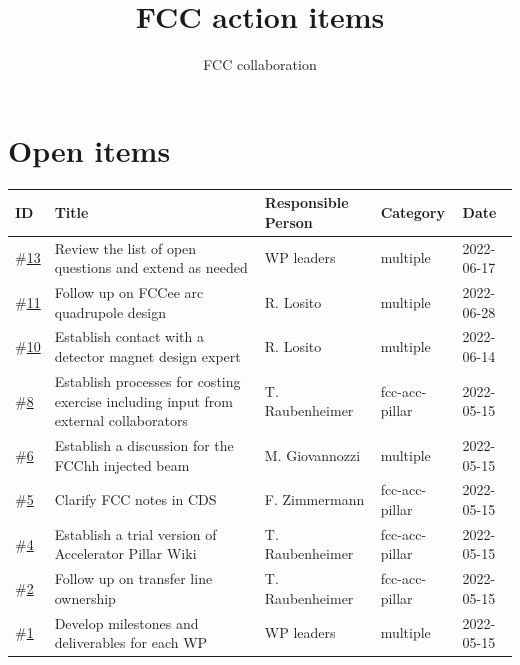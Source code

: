 \documentclass[12pt]{article}
\title{FCC action items}
\author{FCC collaboration}
\date{\LARGE{\color{red}{\textbf{\today}}}}
\begin{document}
	\maketitle

    \section*{Open items}

    \begingroup
    \setlength{\tabcolsep}{10pt} %
    \renewcommand{\arraystretch}{1.5} %
    \begin{longtable}{|m{0.8cm} | m{6cm} | m{3.5cm} | m{2.5cm} | m{2cm}|}
        \hline
        ID & Title & Responsible Person & Category & Date \\
        \hline
        \#\href{https://github.com/fcccollab/fcc-action-items/issues/13}{13} & Review the list of open questions and extend as needed & WP leaders & multiple & 2022-06-17 \\ 
        \hline
        \#\href{https://github.com/fcccollab/fcc-action-items/issues/11}{11} & Follow up on FCCee arc quadrupole design & R. Losito & multiple & 2022-06-28 \\ 
        \hline
        \#\href{https://github.com/fcccollab/fcc-action-items/issues/10}{10} & Establish contact with a detector magnet design expert & R. Losito & multiple & 2022-06-14 \\ 
        \hline
        \#\href{https://github.com/fcccollab/fcc-action-items/issues/8}{8} & Establish processes for costing exercise including input from external collaborators & T. Raubenheimer & fcc-acc-pillar & 2022-05-15 \\ 
        \hline
        \#\href{https://github.com/fcccollab/fcc-action-items/issues/6}{6} & Establish a discussion for the FCChh injected beam & M. Giovannozzi & multiple & 2022-05-15 \\ 
        \hline
        \#\href{https://github.com/fcccollab/fcc-action-items/issues/5}{5} & Clarify FCC notes in CDS & F. Zimmermann & fcc-acc-pillar & 2022-05-15 \\ 
        \hline
        \#\href{https://github.com/fcccollab/fcc-action-items/issues/4}{4} & Establish a trial version of Accelerator Pillar Wiki & T. Raubenheimer & fcc-acc-pillar & 2022-05-15 \\ 
        \hline
        \#\href{https://github.com/fcccollab/fcc-action-items/issues/2}{2} & Follow up on transfer line ownership & T. Raubenheimer & fcc-acc-pillar & 2022-05-15 \\ 
        \hline
        \#\href{https://github.com/fcccollab/fcc-action-items/issues/1}{1} & Develop milestones and deliverables for each WP & WP leaders & multiple & 2022-05-15 \\ 
        \hline
        \end{longtable}
\end{document}
